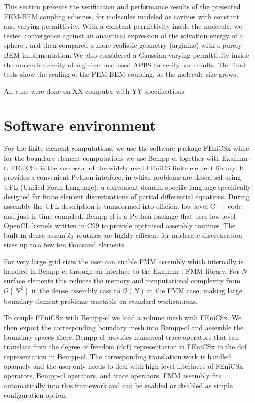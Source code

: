This section presents the verification and performance results of the presented FEM-BEM coupling schemes, for molecules modeled as cavities with constant and varying permittivity.
With a constant permittivity inside the molecule, we tested convergence against an analytical expression of the solvation energy of a sphere \cite{Kirkwood1934}, and then compared a more realistic geometry (arginine) with a purely BEM implementation.
We also considered a Gaussian-varying permittivity\cite{grant2001smooth,li2013dielectric} inside the molecular cavity of arginine, and used APBS \cite{BakerETal2001} to verify our results.
The final tests show the scaling of the FEM-BEM coupling, as the molecule size grows. 

All runs were done on XX computer with YY specifications. 

\section*{\sffamily \Large Software environment}

For the finite element computations, we use the software package FEniCSx while for the boundary element computations we use Bempp-cl together with Exafmm-t. FEniCSx is the successor of the widely used FEniCS finite element library.
It provides a convenient Python interface, in which problems are described using UFL (Unified Form Language), a convenient domain-specific language specifically designed for finite element discretisations of partial differential equations. During assembly the UFL description is transformed into efficient low-level C++ code and just-in-time compiled. Bempp-cl is a Python package that uses low-level OpenCL kernels written in C99 to provide optimised assembly routines. The built-in dense assembly routines are highly efficient for moderate discretisation sizes up to a few ten thousand elements.

For very large grid sizes the user can enable FMM assembly which internally is handled in Bempp-cl through an interface to the Exafmm-t FMM library. For $N$ surface elements this reduces the memory and computational complexity from $\mathcal{O}(N^2)$ in the dense assembly case to $\mathcal{O}(N)$ in the FMM case, making large boundary element problems tractable on standard workstations.

To couple FEniCSx with Bempp-cl we load a volume mesh with FEniCSx. We then export the corresponding boundary mesh into Bempp-cl and assemble the boundary spaces there. Bempp-cl provides numerical trace operators that can translate from the degree of freedom (dof) representation in FEniCSx to the dof representation in Bempp-cl. The corresponding translation work is handled opaquely and the user only needs to deal with high-level interfaces of FEniCSx operators, Bempp-cl operators, and trace operators. FMM assembly fits automatically into this framework and can be enabled or disabled as simple configuration option.

